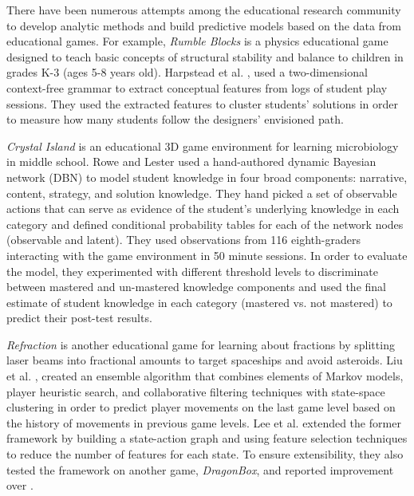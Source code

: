 \documentclass{sigchi}
\begin{document}
There have been numerous attempts among the educational research community to develop analytic methods and build predictive models based on the data from educational games. For example, \textit {Rumble Blocks} \cite{christel2012rumbleblocks} is a physics educational game designed to teach basic concepts of structural stability and balance to children in grades K-3 (ages 5-8 years old). Harpstead et al. \cite{harpstead2013investigating}, used a two-dimensional context-free grammar to extract conceptual features from  logs of student play sessions. They used the extracted features to cluster students' solutions in order to measure how many students follow the designers’ envisioned path.

\textit{Crystal Island} \cite{rowe2010integrating} is an educational 3D game environment for learning microbiology in middle school. 
Rowe and Lester \cite{rowe2010modeling} used a hand-authored dynamic Bayesian network (DBN) to model student knowledge in four broad components: narrative, content, strategy, and solution knowledge. 
They hand picked a set of observable actions that can serve as evidence of the student’s underlying knowledge in each category and defined conditional probability tables for each of the network nodes (observable and latent).
They used observations from 116 eighth-graders interacting with the game environment in 50 minute sessions.
In order to evaluate the model, they experimented with different threshold levels to discriminate between mastered and un-mastered knowledge components and used the final estimate of student knowledge in each category (mastered vs. not mastered) to predict their post-test results.

\textit {Refraction} \cite{andersen2010gameplay} is another educational game for learning about fractions by splitting laser beams into fractional amounts to target spaceships and avoid asteroids. 
Liu et al. \cite{liu2013predicting}, created an ensemble algorithm that combines elements of Markov models, player heuristic search, and collaborative filtering techniques with state-space clustering in order to predict player movements on the last game level based on the history of movements in previous game levels. 
Lee et al. \cite{lee2014learning} extended the former framework by building a state-action graph and using feature selection techniques to reduce the number of features for each state. 
To ensure extensibility, they also tested the framework on another game, \textit {DragonBox}, and reported improvement over \cite{liu2013predicting}.
\end{document}
